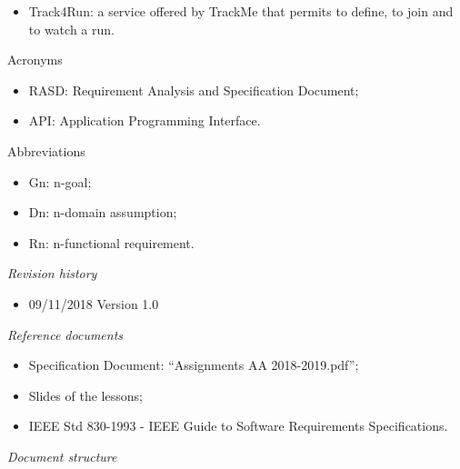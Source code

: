 \documentclass{article}
\begin{document}
\begin{legal}
\begin{legal}
\begin{legal}
{\begin{itemize}
				\item Track4Run: a service offered by TrackMe that permits to define, to join and to watch a run.\\
				\end{itemize}
			}	
			\item Acronyms\\
			{\normalfont	
				\begin{itemize}
				\item RASD: Requirement Analysis and Specification Document;\\
				\item API: Application Programming Interface.\\
				\end{itemize}
			}
			\item Abbreviations\\
			{\normalfont	
				\begin{itemize}
				\item Gn: n-goal;\\
				\item Dn: n-domain assumption;\\
				\item Rn: n-functional requirement.\\
				\end{itemize}
			}
			\end{legal}
		\item \textit{Revision history}\\
		{\normalfont
			\begin{itemize}
			\item 09/11/2018		Version 1.0\\
			\end{itemize}
		}
		\item \textit{Reference documents}\\
		{\normalfont	
			\begin{itemize}
			\item Specification Document: “Assignments AA 2018-2019.pdf”;\\
			\item Slides of the lessons;\\
			\item IEEE Std 830-1993 - IEEE Guide to Software Requirements Specifications.\\
			\end{itemize}
		}
		\end{legal}
		\item \textit{Document structure}\\

\end{legal}
\end{document}
